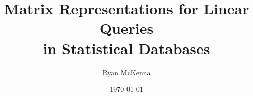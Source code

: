 \documentclass[12]{article}
\begin{document}
\title{Matrix Representations for Linear Queries \\ in Statistical Databases}
\author{Ryan McKenna}
\date{\today}
\maketitle






\end{document}
